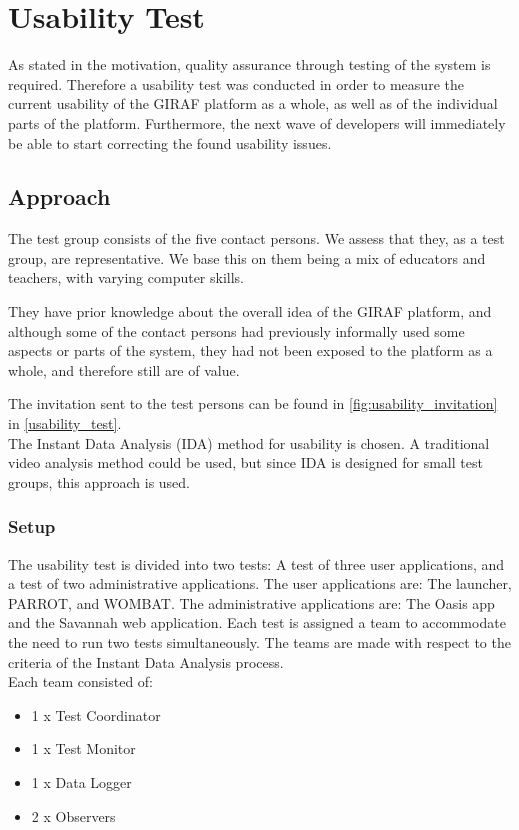 \section{Usability Test}
\label{common:sec:usability_test}
As stated in the motivation, quality assurance through testing of the system is required. Therefore a usability test was conducted in order to measure the current usability of the GIRAF platform as a whole, as well as of the individual parts of the platform. Furthermore, the next wave of developers will immediately be able to start correcting the found usability issues.

\subsection{Approach}
The test group consists of the five contact persons. We assess that they, as a test group, are representative. We base this on them being a mix of educators and teachers, with varying computer skills.

They have prior knowledge about the overall idea of the GIRAF platform, and although some of the contact persons had previously informally used some aspects or parts of the system, they had not been exposed to the platform as a whole, and therefore still are of value.

The invitation sent to the test persons can be found in \autoref{fig:usability_invitation} in \autoref{usability_test}.\\

The Instant Data Analysis (IDA) method for usability is chosen. A traditional video analysis method could be used, but since IDA is designed for small test groups, this approach is used. \cite{usability:ida}

\subsubsection{Setup}
The usability test is divided into two tests: A test of three user applications, and a test of two administrative applications. 
The user applications are: The launcher, PARROT, and WOMBAT. The administrative applications are: The Oasis app and the Savannah web application.
Each test is assigned a team to accommodate the need to run two tests simultaneously.
The teams are made with respect to the criteria of the Instant Data Analysis process.\\
Each team consisted of:

\begin{itemize}
	\item 1 x Test Coordinator
	\item 1 x Test Monitor
	\item 1 x Data Logger
	\item 2 x Observers
\end{itemize}

